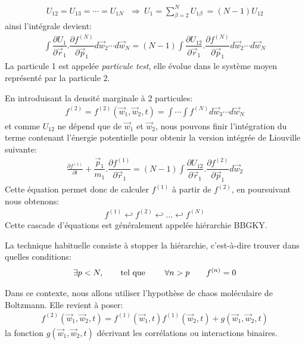 \begin{align*}
	U_{12}=U_{13}=\cdots=U_{1N}\ \ \ \Rightarrow\ U_{1}=\sum_{\beta=2}^{N}U_{1\beta}\ =\left(  N-1\right)  U_{12}
\end{align*}
ainsi l'intégrale devient:
\begin{align*}
	\displaystyle\int\dfrac{\partial U_{1}}{\partial\vec{r}_{1}}.\dfrac{\partial f^{(N)}}{\partial\vec{p}_{1}}d\vec{w}_{2}\cdots d\vec{w}%
	_{N}=\left(  N-1\right)  \displaystyle\int\dfrac{\partial U_{12}}{\partial\vec{r}_{1}}.\dfrac{\partial f^{(N)}}{\partial\vec{p}_{1}%
	}d\vec{w}_{2}\cdots d\vec{w}_{N}%
\end{align*}
La particule 1 est appelée \og\emph{particule test}\fg, elle évolue dans le système moyen représenté par la particule 2.

En introduisant la densité marginale à 2 particules:
\begin{align*}
	f^{(2)}=f^{(2)}(\vec{w}_{1},\vec{w}_{2},t)=\int\cdots\int f^{(N)}d\vec{w}_{3}\cdots d\vec{w}_{N}
\end{align*}
et comme $U_{12}$ ne dépend que de $\vec{w}_{1}$ et $\vec{w}_{2}$, nous pouvons finir l'intégration du terme contenant l'énergie potentielle pour
obtenir la version intégrée de Liouville suivante:
\begin{align}
	\frac{\partial f^{(1)}}{\partial t}+\dfrac{\vec{p}_{1}}{m_{1}}.\dfrac{\partial f^{(1)}}{\partial\vec{r}_{1}}=\left(  N-1\right)
	\displaystyle \int\dfrac{\partial U_{12}}{\partial\vec{r}_{1}}.\dfrac{\partial f^{(2)}}{\partial\vec{p}_{1}}d\vec{w}_{2}%
	\label{liouint}%
\end{align}
Cette équation permet donc de calculer $f^{(1)}$ à partir de $f^{(2)}$, en poursuivant nous obtenons:
\begin{align*}
	f^{(1)}\hookleftarrow f^{(2)}\hookleftarrow...\hookleftarrow f^{(N)}
\end{align*}
Cette cascade d'équations est généralement appelée
hiérarchie BBGKY.

La technique habituelle consiste à stopper la hiérarchie, c'est-à-dire trouver dans quelles conditions:
\begin{align*}
	\exists p<N,\qquad\text{tel que \qquad}\forall n>p\qquad f^{\left(  n\right) }=0
\end{align*}


Dans ce contexte, nous allons utiliser l'hypothèse de chaos moléculaire de Boltzmann. Elle revient à poser:
\begin{align*}
	f^{(2)}(\vec{w}_{1},\vec{w}_{2},t)=f^{(1)}(\vec{w}_{1},t)f^{(1)}(\vec{w}_{2},t)+g(\vec{w}_{1},\vec{w}_{2},t)
\end{align*}
la fonction $g(\vec{w}_{1},\vec{w}_{2},t)$ décrivant les corrélations ou interactions binaires.

